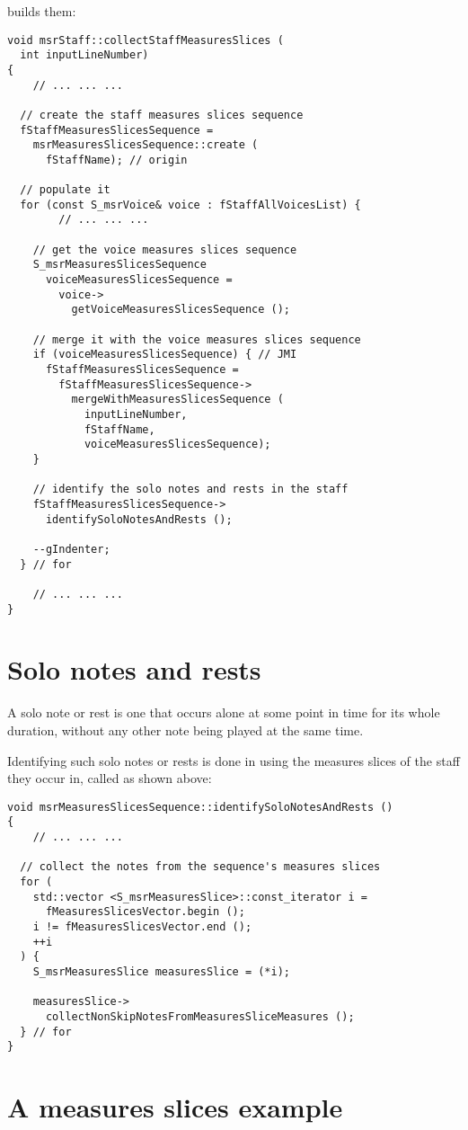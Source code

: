  builds them:
\begin{lstlisting}[language=CPlusPlus]
void msrStaff::collectStaffMeasuresSlices (
  int inputLineNumber)
{
	// ... ... ...

  // create the staff measures slices sequence
  fStaffMeasuresSlicesSequence =
    msrMeasuresSlicesSequence::create (
      fStaffName); // origin

  // populate it
  for (const S_msrVoice& voice : fStaffAllVoicesList) {
		// ... ... ...

    // get the voice measures slices sequence
    S_msrMeasuresSlicesSequence
      voiceMeasuresSlicesSequence =
        voice->
          getVoiceMeasuresSlicesSequence ();

    // merge it with the voice measures slices sequence
    if (voiceMeasuresSlicesSequence) { // JMI
      fStaffMeasuresSlicesSequence =
        fStaffMeasuresSlicesSequence->
          mergeWithMeasuresSlicesSequence (
            inputLineNumber,
            fStaffName,
            voiceMeasuresSlicesSequence);
    }

    // identify the solo notes and rests in the staff
    fStaffMeasuresSlicesSequence->
      identifySoloNotesAndRests ();

    --gIndenter;
  } // for

	// ... ... ...
}
\end{lstlisting}


\section{Solo notes and rests}

A solo note or rest is one that occurs alone at some point in time for its whole duration, without any other note being played at the same time.

Identifying such solo notes or rests is done in  using the measures slices of the staff they occur in, called  as shown above:
\begin{lstlisting}[language=CPlusPlus]
void msrMeasuresSlicesSequence::identifySoloNotesAndRests ()
{
	// ... ... ...

  // collect the notes from the sequence's measures slices
  for (
    std::vector <S_msrMeasuresSlice>::const_iterator i =
      fMeasuresSlicesVector.begin ();
    i != fMeasuresSlicesVector.end ();
    ++i
  ) {
    S_msrMeasuresSlice measuresSlice = (*i);

    measuresSlice->
      collectNonSkipNotesFromMeasuresSliceMeasures ();
  } // for
}
\end{lstlisting}


\section{A measures slices example}


